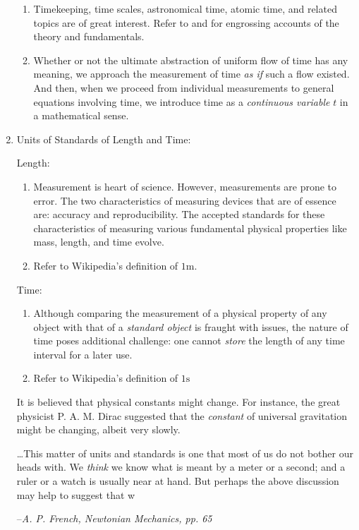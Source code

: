 \documentclass[12pt,a4paper]{book}
\begin{document}
\begin{enumerate}
\begin{enumerate}
            \item Timekeeping, time scales, astronomical time, atomic time, and related topics are of great interest. Refer to \cite{sundials-atomic} and \cite{nbs-time-freq} for engrossing accounts of the theory and fundamentals.
            \item Whether or not the ultimate abstraction of uniform flow of time has any meaning, we approach the measurement of time \emph{as if} such a flow existed. And then, when we proceed from individual measurements to general equations involving time, we introduce time as a \emph{continuous variable} $t$ in a mathematical sense.
        \end{enumerate}
    \item Units of Standards of Length and Time:

        Length:
        \begin{enumerate}
            \item Measurement is heart of science. However, measurements are prone to error. The two characteristics of measuring devices that are of essence are: accuracy and reproducibility. The accepted standards for these characteristics of measuring various fundamental physical properties like mass, length, and time evolve. 
            \item Refer to Wikipedia's definition of $1\si{\metre}$.
        \end{enumerate}
        
        Time:
        \begin{enumerate}
            \item Although comparing the measurement of a physical property of any object with that of a \emph{standard object} is fraught with issues, the nature of time poses additional challenge: one cannot \emph{store} the length of any time interval for a later use.
            \item Refer to Wikipedia's definition of $1\si{\second}$
        \end{enumerate}

        It is believed that physical constants might change. For instance, the great physicist P. A. M. Dirac suggested that the \emph{constant} of universal gravitation might be changing, albeit very slowly.

        \epigraph
        {
            \dots This matter of units and standards is one that most of us do not bother our heads with. We \emph{think} we know what is meant by a meter or a second; and a ruler or a watch is usually near at hand. But perhaps the above discussion may help to suggest that w
        }
        {
            --\textit{A. P. French, Newtonian Mechanics, pp. 65}
        }

\end{enumerate}
\end{document}
